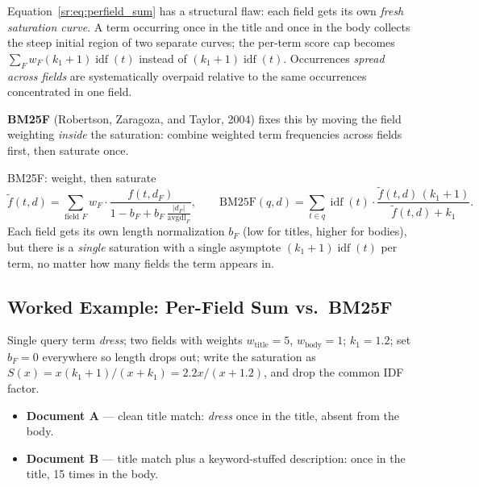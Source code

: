 Equation~\eqref{sr:eq:perfield_sum} has a structural flaw: each field gets its own \emph{fresh saturation curve}. A term occurring once in the title and once in the body collects the steep initial region of two separate curves; the per-term score cap becomes $\sum_F w_F (k_1+1)\operatorname{idf}(t)$ instead of $(k_1+1)\operatorname{idf}(t)$. Occurrences \emph{spread across fields} are systematically overpaid relative to the same occurrences concentrated in one field.

\textbf{BM25F} (Robertson, Zaragoza, and Taylor, 2004) fixes this by moving the field weighting \emph{inside} the saturation: combine weighted term frequencies across fields first, then saturate once.

\begin{mathresult}{BM25F: weight, then saturate}
\begin{equation}
\tilde{f}(t,d) = \sum_{\text{field } F} w_F \cdot \frac{f(t, d_F)}{1 - b_F + b_F\,\frac{|d_F|}{\text{avgdl}_F}},
\qquad
\text{BM25F}(q,d) = \sum_{t \in q} \operatorname{idf}(t) \cdot \frac{\tilde{f}(t,d)\,(k_1+1)}{\tilde{f}(t,d) + k_1}.
\label{sr:eq:bm25f}
\end{equation}
Each field gets its own length normalization $b_F$ (low for titles, higher for bodies), but there is a \emph{single} saturation with a single asymptote $(k_1+1)\operatorname{idf}(t)$ per term, no matter how many fields the term appears in.
\end{mathresult}

\subsection{Worked Example: Per-Field Sum vs.\ BM25F}

Single query term \emph{dress}; two fields with weights $w_{\text{title}} = 5$, $w_{\text{body}} = 1$; $k_1 = 1.2$; set $b_F = 0$ everywhere so length drops out; write the saturation as $S(x) = x(k_1+1)/(x+k_1) = 2.2x/(x+1.2)$, and drop the common IDF factor.

\begin{itemize}
    \item \textbf{Document A} --- clean title match: \emph{dress} once in the title, absent from the body.
    \item \textbf{Document B} --- title match plus a keyword-stuffed description: once in the title, 15 times in the body.
\end{itemize}

